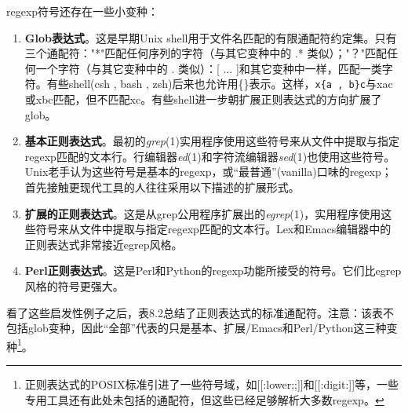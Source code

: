 \documentclass[12pt,oneside]{book}
\begin{document}
regexp符号还存在一些小变种：
\begin{enumerate}
\item \textbf{Glob表达式}。这是早期Unix shell用于文件名匹配的有限通配符约定集。只有三个通配符："*"匹配任何序列的字符（与其它变种中的 .* 类似）；"？"匹配任何一个字符（与其它变种中的 . 类似）：[ ... ]和其它变种中一样，匹配一类字符。有些shell(csh , bash , zsh)后来也允许用\{\}表示。这样，\verb+x{a , b}c+与xac或xbc匹配，但不匹配xc。有些shell进一步朝扩展正则表达式的方向扩展了glob。
\item \textbf{基本正则表达式}。最初的\textit{grep}(1)实用程序使用这些符号来从文件中提取与指定regexp匹配的文本行。行编辑器\textit{ed}(1)和字符流编辑器\textit{sed}(1)也使用这些符号。Unix老手认为这些符号是基本的regexp，或“最普通”(vanilla)口味的regexp；首先接触更现代工具的人往往采用以下描述的扩展形式。
\item \textbf{扩展的正则表达式}。这是从grep公用程序扩展出的\textit{egrep}(1)，实用程序使用这些符号来从文件中提取与指定regexp匹配的文本行。Lex和Emacs编辑器中的正则表达式非常接近egrep风格。
\item \textbf{Perl正则表达式}。这是Perl和Python的regexp功能所接受的符号。它们比egrep风格的符号更强大。
\end{enumerate}

看了这些启发性例子之后，表8.2总结了正则表达式的标准通配符。注意：该表不包括glob变种，因此“全部”代表的只是基本、扩展/Emacs和Perl/Python这三种变种\footnote{正则表达式的POSIX标准引进了一些符号域，如[[:lower;;]]和[[:digit:]]等，一些专用工具还有此处未包括的通配符，但这些已经足够解析大多数regexp。}。
\end{document}
